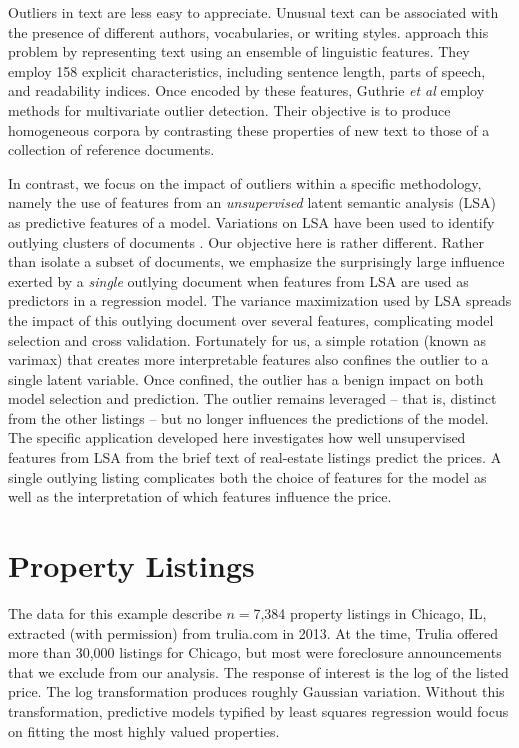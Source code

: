\documentclass[12pt]{article}\usepackage[]{graphicx}\usepackage[]{color}
\begin{document}
 Outliers in text are less easy to appreciate.  Unusual text can be
 associated with the presence of different authors, vocabularies, or
 writing styles.  \citet{guthrie08} approach this problem by
 representing text using an ensemble of linguistic features.  They
 employ 158 explicit characteristics, including sentence length, parts
 of speech, and readability indices.  Once encoded by these features,
 Guthrie {\it et al} employ methods for multivariate outlier detection.
  Their objective is to produce homogeneous corpora by contrasting
 these properties of new text to those of a collection of reference
 documents.


 In contrast, we focus on the impact of outliers within a specific
 methodology, namely the use of features from an {\em unsupervised}
 latent semantic analysis (LSA) as predictive features of a model.
  Variations on LSA have been used to identify outlying clusters of
 documents \citep[\eg][]{kobayashi02}.  Our objective here is rather
 different.  Rather than isolate a subset of documents, we emphasize
 the surprisingly large influence exerted by a {\em single} outlying
 document when features from LSA are used as predictors in a
 regression model.  The variance maximization used by LSA spreads the
 impact of this outlying document over several features, complicating
 model selection and cross validation.  Fortunately for us, a simple
 rotation (known as varimax) that creates more interpretable features
 also confines the outlier to a single latent variable.  Once
 confined, the outlier has a benign impact on both model selection and
 prediction.  The outlier remains leveraged -- that is, distinct from
 the other listings -- but no longer influences the predictions of the
 model.  The specific application developed here investigates how well
 unsupervised features from LSA from the brief text of real-estate
 listings predict the prices.  A single outlying listing complicates
 both the choice of features for the model as well as the
 interpretation of which features influence the price.


\section{Property Listings}
\label{sec:listings}

 The data for this example describe $n=$7,384 property listings in
 Chicago, IL, extracted (with permission) from trulia.com in 2013.  At
 the time, Trulia offered more than 30,000 listings for Chicago, but
 most were foreclosure announcements that we exclude from our
 analysis.  The response of interest is the log of the listed price.
  The log transformation produces roughly Gaussian variation.  Without
 this transformation, predictive models typified by least squares
 regression would focus on fitting the most highly valued properties.
\end{document}
